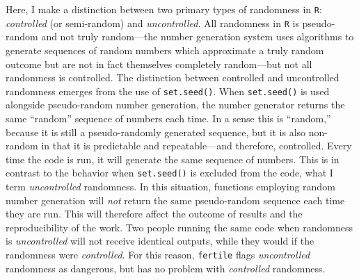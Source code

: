\documentclass[12pt,twoside]{reedthesis}
\begin{document}
Here, I make a distinction between two primary types of randomness in \texttt{R}: \emph{controlled} (or semi-random) and \emph{uncontrolled}. All randomness in \texttt{R} is pseudo-random and not truly random---the number generation system uses algorithms to generate sequences of random numbers which approximate a truly random outcome but are not in fact themselves completely random---but not all randomness is controlled. The distinction between controlled and uncontrolled randomness emerges from the use of \texttt{set.seed()}. When \texttt{set.seed()} is used alongside pseudo-random number generation, the number generator returns the same ``random'' sequence of numbers each time. In a sense this is ``random,'' because it is still a pseudo-randomly generated sequence, but it is also non-random in that it is predictable and repeatable---and therefore, controlled. Every time the code is run, it will generate the same sequence of numbers. This is in contrast to the behavior when \texttt{set.seed()} is excluded from the code, what I term \emph{uncontrolled} randomness. In this situation, functions employing random number generation will \emph{not} return the same pseudo-random sequence each time they are run. This will therefore affect the outcome of results and the reproducibility of the work. Two people running the same code when randomness is \emph{uncontrolled} will not receive identical outputs, while they would if the randomness were \emph{controlled}. For this reason, \texttt{fertile} flags \emph{uncontrolled} randomness as dangerous, but has no problem with \emph{controlled} randomness.
\end{document}
